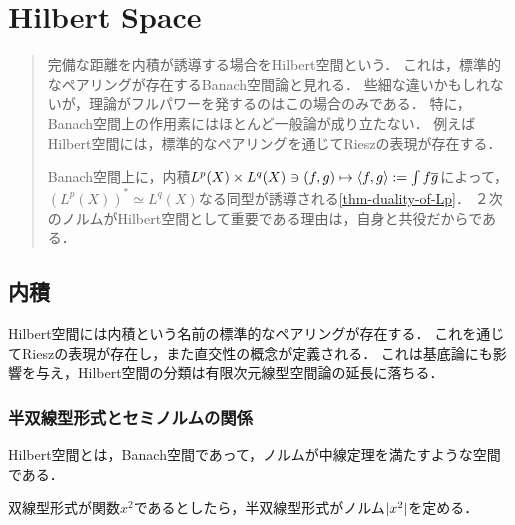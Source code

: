 \documentclass[uplatex,dvipdfmx]{jsreport}
\begin{document}
\chapter{Hilbert Space}

\begin{quotation}
    完備な距離を内積が誘導する場合をHilbert空間という．
    これは，標準的なペアリングが存在するBanach空間論と見れる．
    些細な違いかもしれないが，理論がフルパワーを発するのはこの場合のみである．
    特に，Banach空間上の作用素にはほとんど一般論が成り立たない．
    例えばHilbert空間には，標準的なペアリングを通じてRieszの表現が存在する．

    Banach空間上に，内積$L^p(X)\times L^q(X)\ni(f,g)\mapsto\langle f,g\rangle:=\int f\overline{g}$によって，
    $(L^p(X))^*\simeq L^q(X)$なる同型が誘導される\ref{thm-duality-of-Lp}．
    ２次のノルムがHilbert空間として重要である理由は，自身と共役だからである．
\end{quotation}

\section{内積}

\begin{tcolorbox}[colframe=ForestGreen, colback=ForestGreen!10!white,breakable,colbacktitle=ForestGreen!40!white,coltitle=black,fonttitle=\bfseries\sffamily,
title=]
    Hilbert空間には内積という名前の標準的なペアリングが存在する．
    これを通じてRieszの表現が存在し，また直交性の概念が定義される．
    これは基底論にも影響を与え，Hilbert空間の分類は有限次元線型空間論の延長に落ちる．
\end{tcolorbox}

\subsection{半双線型形式とセミノルムの関係}

\begin{tcolorbox}[colframe=ForestGreen, colback=ForestGreen!10!white,breakable,colbacktitle=ForestGreen!40!white,coltitle=black,fonttitle=\bfseries\sffamily,
title=]
    Hilbert空間とは，Banach空間であって，ノルムが中線定理を満たすような空間である．

    双線型形式が関数$x^2$であるとしたら，半双線型形式がノルム$\lvert x^2\rvert$を定める．
\end{tcolorbox}
\end{document}
